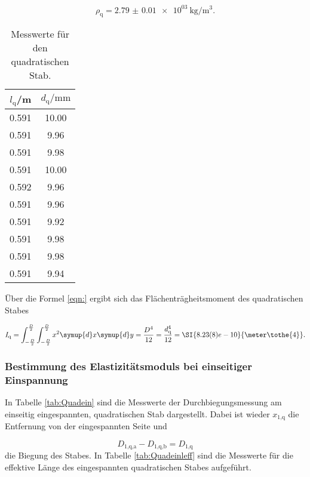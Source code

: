 \begin{equation}
  \rho_\text{q} = \SI{2.79(1)e03}{\kilo\gram\per\cubic\meter}.
\end{equation}

\begin{table}[H]
  \centering
  \caption{Messwerte für den quadratischen Stab.}
  \label{tab:Dichtequad}
  \begin{tabular}{c c}
    \toprule
    $l_\text{q}$/\si{\meter} & $d_\text{q}/\si{\milli\meter}$ \\
    \midrule
    0.591 & 10.00 \\
    0.591 & 9.96 \\
    0.591 & 9.98 \\
    0.591 & 10.00 \\
    0.592 & 9.96 \\
    0.591 & 9.96 \\
    0.591 & 9.92 \\
    0.591 & 9.98 \\
    0.591 & 9.98 \\
    0.591 & 9.94 \\
    \bottomrule
  \end{tabular}
\end{table}

Über die Formel \eqref{eqn:} ergibt sich das Flächenträgheitsmoment des
quadratischen Stabes

\begin{equation}
  I_\text{q} = \int_{-\frac{D}{2}}^{\frac{D}{2}}
  \int_{-\frac{D}{2}}^{\frac{D}{2}} x^2 \symup{d}x \symup{d}y = \frac{D^4}{12} =
  \frac{d_\text{q}^4}{12} = \SI{8.23(8)e-10}{\meter\tothe{4}}.
\end{equation}

\subsubsection{Bestimmung des Elastizitätsmoduls bei einseitiger Einspannung}

In Tabelle \ref{tab:Quadein} sind die Messwerte der Durchbiegungsmessung am
einseitig eingespannten, quadratischen Stab dargestellt.
Dabei ist wieder $x_\text{1,q}$ die Entfernung von der eingespannten Seite
und

\begin{equation}
  D_\text{1,q,a} - D_\text{1,q,b} = D_\text{1,q}
\end{equation}
die Biegung des Stabes.
In Tabelle \ref{tab:Quadeinleff} sind die Messwerte für die effektive
Länge des eingespannten quadratischen Stabes aufgeführt.

